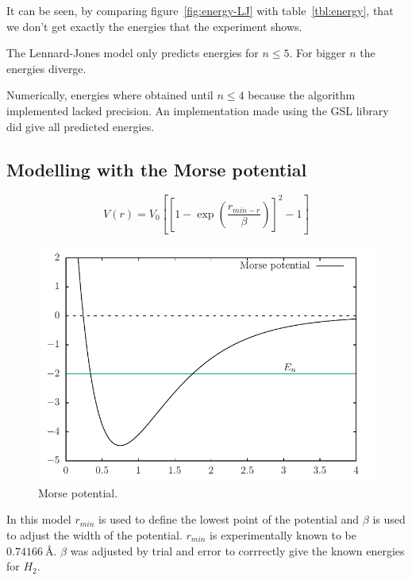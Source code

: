 \documentclass[11pt]{article}
\begin{document}
It can be seen, by comparing figure~\ref{fig:energy-LJ} with table~\ref{tbl:energy}, that we don't get exactly the energies that the experiment shows.

The Lennard-Jones model only predicts energies for $n\le5$. For bigger $n$ the energies diverge.

Numerically, energies where obtained until $n\le4$ because the algorithm implemented lacked precision. An implementation made using the GSL library did give all predicted energies.

\subsection{Modelling with the Morse potential}
\begin{equation*}
  V(r) = V_0\left[\left[1-\exp{\left(\frac{r_{min-r}}{\beta}\right)}\right]^2-1 \right]
\end{equation*}
\begin{figure}[H]
  \centering
  \includegraphics[width=\linewidth]{potential-Morse}
  \caption{Morse potential.}
\label{fig:potential-Morse}
\end{figure}
In this model $r_{min}$ is used to define the lowest point of the potential and $\beta$ is used to adjust the width of the potential. $r_{min}$ is experimentally known to be $\SI{0.74166}{\angstrom}$. $\beta$ was adjusted by trial and error to corrrectly give the known energies for $H_2$.
\end{document}
